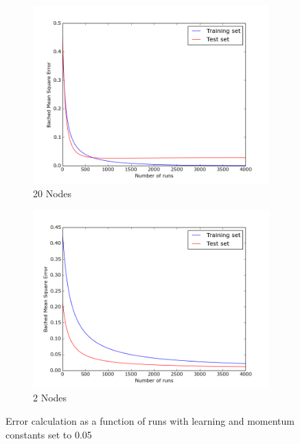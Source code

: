 \documentclass{article}
\begin{document}
\begin{figure}
    \centering
    \begin{subfigure}[b]{0.49\textwidth}
        \includegraphics[width=1.0\textwidth]{Part1/20Nodes.png}
        \caption{20 Nodes}
        \label{fig:2scatter}
    \end{subfigure}
    \begin{subfigure}[b]{0.49\textwidth}
        \includegraphics[width=1.0\textwidth]{Part1/2Nodes.png}
        \caption{2 Nodes} 
        \label{fig:2scatter}
    \end{subfigure}
    \caption{Error calculation as a function of runs with learning and momentum constants set to 0.05}
    \label{}
\end{figure}
\end{document}
